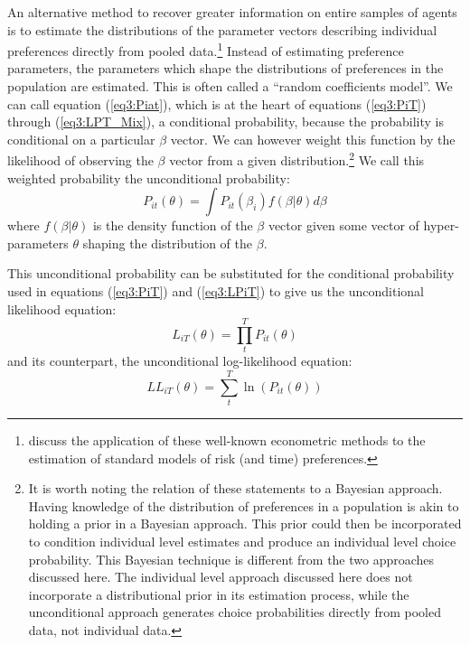 \documentclass[../main.tex]{subfiles}
\begin{document}
An alternative method to recover greater information on entire samples of agents is to estimate the distributions of the parameter vectors describing individual preferences directly from pooled data.\footnote{
	\textcite{Andersen2012} discuss the application of these well-known econometric methods to the estimation of standard models of risk (and time) preferences.
}
Instead of estimating preference parameters, the parameters which shape the distributions of preferences in the population are estimated.
This is often called a \enquote{random coefficients model}.
We can call equation (\ref{eq3:Piat}), which is at the heart of equations (\ref{eq3:PiT}) through (\ref{eq3:LPT_Mix}), a conditional probability, because the probability is conditional on a particular $\beta$ vector.
We can however weight this function by the likelihood of observing the $\beta$ vector from a given distribution.\footnote{
	It is worth noting the relation of these statements to a Bayesian approach.
	Having knowledge of the distribution of preferences in a population is akin to holding a prior in a Bayesian approach.
	This prior could then be incorporated to condition individual level estimates and produce an individual level choice probability.
	This Bayesian technique is different from the two approaches discussed here.
	The individual level approach discussed here does not incorporate a distributional prior in its estimation process, while the unconditional approach generates choice probabilities directly from pooled data, not individual data.
}
We call this weighted probability the unconditional probability:
\begin{equation}
	\label{eq3:Pit}
	P_{it}(\theta) = \int P_{it}(\beta_i) f(\beta | \theta) d\beta
\end{equation}
\noindent where $f(\beta|\theta)$ is the density function of the $\beta$ vector given some vector of hyper-parameters $\theta$ shaping the distribution of the $\beta$.

This unconditional probability can be substituted for the conditional probability used in equations (\ref{eq3:PiT}) and (\ref{eq3:LPiT}) to give us the unconditional likelihood equation:
\begin{equation}
	\label{eq3:LiT}
	L_{iT}(\theta) = \prod_t^T P_{it}(\theta)
\end{equation}
\noindent and its counterpart, the unconditional log-likelihood equation:
\begin{equation}
	\label{eq3:LLiT}
	\mathit{LL}_{iT}(\theta) = \sum_t^T \ln \left( P_{it}(\theta) \right)
\end{equation}
\end{document}
